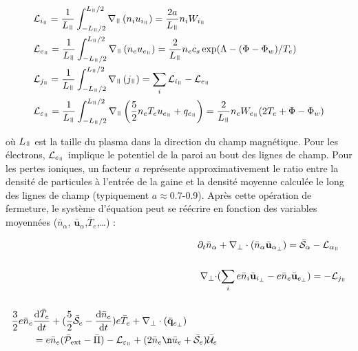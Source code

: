 \begin{refsection}
\begin{align}
\label{3-vitessesBord}
\begin{split}
\mathcal{L}&_{i_\para}=\frac{1}{L_\para}\int_{-L_\para/2}^{L_\para/2}\nabla_\para\left(n_iu_{i_\para}\right)=\frac{2a}{L_\para}n_iW_{i_\para}\\
\mathcal{L}&_{e_\para}=\frac{1}{L_\para}\int_{-L_\para/2}^{L_\para/2}\nabla_\para\left(n_eu_{e_\para}\right)=\frac{2}{L_\para}n_ec_s
\exp(\Lambda-(\Phi-\Phi_w)/T_e)\\
\mathcal{L}&_{j_\para}=\frac{1}{L_\para}\int_{-L_\para/2}^{L_\para/2}\nabla_\para\left(j_\para\right)=\sum_i\mathcal{L}_{i_\para}-\mathcal{L}_{e_\para}\\
\mathcal{L}&_{\varepsilon_\para}=\frac{1}{L_\para}
\int_{-L_\para/2}^{L_\para/2}\nabla_\para
\left(\frac{5}{2}n_eT_eu_{e_\para}+q_{e_\para}\right)
=\frac{2}{L_\para}n_eW_{e_\para}(2T_e+\Phi-\Phi_w)
\end{split}
\end{align}

où $L_\para$ est la taille du plasma dans la direction du champ magnétique. Pour
les électrons, $\mathcal{L}_{e_\para}$ implique le potentiel de la
paroi au bout des lignes de champ. Pour les pertes ioniques, un facteur $a$
représente approximativement le ratio entre la densité de particules à l'entrée
de la gaine et la densité moyenne calculée le long des lignes de champ
(typiquement $a\approx$0.7-0.9).
Après cette opération de fermeture, le système d'équation peut se réécrire en
fonction des variables moyennées ($\bar{n}_\alpha$, $\bar{\mathbf
u}_\alpha$,$\bar{T}_e$,\ldots) :

\begin{align}
\label{3-equations2D1}
\partial_t \bar{n}_\alpha& +
\nabla_\perp\cdot\left(\bar{n}_\alpha\bar{\mathbf{u}}_{\alpha_\perp}\right)=\bar{\mathcal{S}}_\alpha
- \mathcal{L}_{\alpha_\para}\\[0.5cm]
\nabla_\perp\cdot&(\sum_ie\bar{n}_i\bar{\mathbf{u}}_{i_\perp}
-e\bar{n}_e\bar{\mathbf{u}}_{e_\perp})= - \mathcal{L}_{j_\para}\\[0.5cm]
\begin{split}\frac{3}{2}e\bar{n}_e&\frac{\text{d}\bar{T}_e}{\text{d}t} +
(\frac{5}{2}\bar{\mathcal{S}}_e
-\frac{\text{d}\bar{n}_e}{\text{d}t})e\bar{T}_e+\nabla_\perp\cdot(\bar{\mathbf{q}}_{e_\perp})\\
&=e\bar{n}_e(\bar{\mathcal{P}}_\text{ext}-\bar{\Pi})-\mathcal{L}_{\varepsilon_\para}
+(2\bar{n}_e\n\bar{u}_e+\bar{\mathcal{S}}_e)\bar{\mathcal{U}}_e
\label{3-equations2D2}
\end{split}
\end{align}


\end{refsection}
